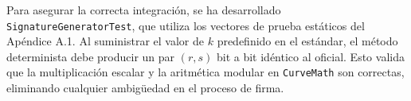 Para asegurar la correcta integración, se ha desarrollado \texttt{SignatureGeneratorTest}, que utiliza los vectores de prueba estáticos del Apéndice A.1. Al suministrar el valor de $k$ predefinido en el estándar, el método determinista debe producir un par $(r, s)$ bit a bit idéntico al oficial. Esto valida que la multiplicación escalar y la aritmética modular en \texttt{CurveMath} son correctas, eliminando cualquier ambigüedad en el proceso de firma.